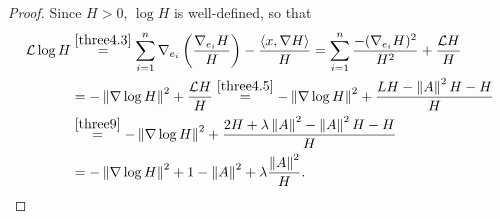 \documentclass[12pt,reqno]{amsart}
\theoremstyle{definition}
\newcommand{\vnormt}[1]{\left\|#1\right\|}    %
\newcommand{\sdimn}{n}
\newcommand{\scon}{\lambda}
\begin{document}
\begin{proof}
Since $H>0$, $\log H$ is well-defined, so that
\begin{equation}\label{logeq}
\begin{aligned}
\mathcal{L}\log H
&\stackrel{\eqref{three4.3}}{=}\sum_{i=1}^{\sdimn}\nabla_{e_{i}}\left(\frac{\nabla_{e_{i}}H}{H}\right)-\frac{\langle x,\nabla H\rangle}{H}
=\sum_{i=1}^{\sdimn}\frac{-(\nabla_{e_{i}}H)^{2}}{H^{2}}+\frac{\mathcal{L}H}{H}\\
&=-\vnormt{\nabla\log H}^{2}+\frac{\mathcal{L}H}{H}
\stackrel{\eqref{three4.5}}{=}-\vnormt{\nabla\log H}^{2}+\frac{LH -\vnormt{A}^{2}H-H}{H}\\
&\stackrel{\eqref{three9}}{=}-\vnormt{\nabla\log H}^{2}+\frac{2H+\scon\vnormt{A}^{2} -\vnormt{A}^{2}H-H}{H}\\
&=-\vnormt{\nabla\log H}^{2}+1-\vnormt{A}^{2}+\scon\frac{\vnormt{A}^{2}}{H}.
\end{aligned}
\end{equation}%


\end{proof}
\end{document}
